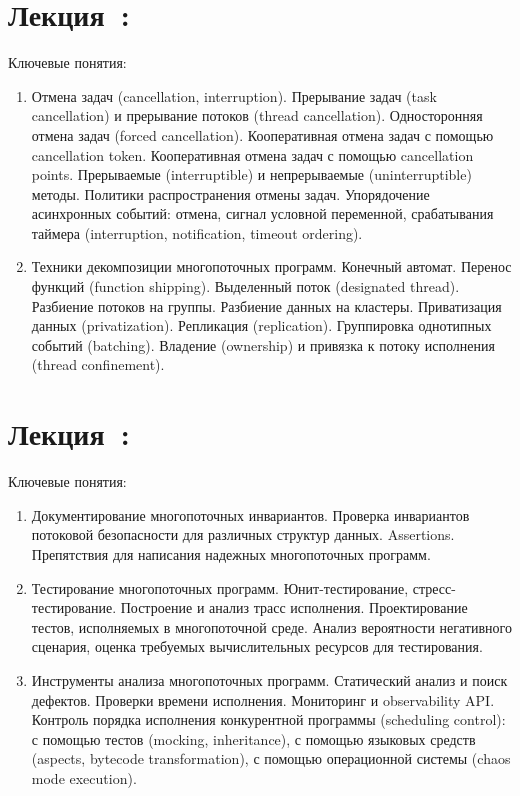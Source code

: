 \documentclass[a4paper, 12pt]{extarticle}
\begin{document}
\section{Лекция~\patternsNum: \patternsTopic}

Ключевые понятия: \patternsKey

\begin{enumerate}[\thesection .1]
	\item Отмена задач (cancellation, interruption).
	Прерывание задач (task cancellation) и прерывание потоков (thread cancellation).
	Односторонняя отмена задач (forced cancellation). 
	Кооперативная отмена задач с помощью cancellation token.
	Кооперативная отмена задач с помощью cancellation points.
	Прерываемые (interruptible) и непрерываемые (uninterruptible) методы.
	Политики распространения отмены задач. 
	Упорядочение асинхронных событий: отмена, сигнал условной переменной, срабатывания таймера (interruption, notification, timeout ordering).	

	\item Техники декомпозиции многопоточных программ. Конечный автомат. Перенос функций (function shipping). Выделенный поток (designated thread).
	Разбиение потоков на группы. Разбиение данных на кластеры. Приватизация данных (privatization). Репликация (replication).
	Группировка однотипных событий (batching). Владение (ownership) и привязка к потоку исполнения (thread confinement).
\end{enumerate}


\section{Лекция~\extraBasicsNum: \extraBasicsTopic}

Ключевые понятия: \extraBasicsKey

\begin{enumerate}[\thesection .1]

	\item Документирование многопоточных инвариантов. Проверка инвариантов потоковой безопасности для различных структур данных.
	Assertions. Препятствия для написания надежных многопоточных программ.	 

	\item Тестирование многопоточных программ. Юнит-тестирование, стресс-тестирование. Построение и анализ трасс исполнения.
	Проектирование тестов, исполняемых в многопоточной среде. Анализ вероятности негативного сценария, оценка требуемых вычислительных ресурсов для тестирования.  
	
	\item Инструменты анализа многопоточных программ. Статический анализ и поиск дефектов. Проверки времени исполнения.
	Мониторинг и observability API. Контроль порядка исполнения конкурентной программы (scheduling control): с помощью тестов (mocking, inheritance), с помощью языковых средств (aspects, bytecode transformation),
	с помощью операционной системы (chaos mode execution). 

\end{enumerate}
\end{document}
